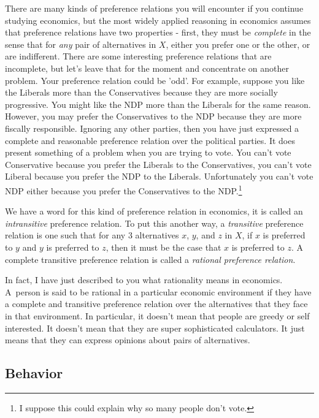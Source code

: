 \documentclass[12pt]{article}
\begin{document}
There are many kinds of preference relations you will encounter if you
continue studying economics, but the most widely applied reasoning in
economics assumes that preference relations have two properties - first, they
must be \emph{complete} in the sense that for \emph{any} pair of alternatives
in $X$, either you prefer one or the other, or are indifferent. There are some
interesting preference relations that are incomplete, but let's leave that for
the moment and concentrate on another problem. Your preference relation could
be 'odd'. For example, suppose you like the Liberals more than the
Conservatives because they are more socially progressive. You might like the
NDP more than the Liberals for the same reason. However, you may prefer the
Conservatives to the NDP because they are more fiscally responsible. Ignoring
any other parties, then you have just expressed a complete and reasonable
preference relation over the political parties. It does present something of a
problem when you are trying to vote. You can't vote Conservative because you
prefer the Liberals to the Conservatives, you can't vote Liberal because you
prefer the NDP to the Liberals. Unfortunately you can't vote NDP either
because you prefer the Conservatives to the NDP.\footnote{I suppose this could
explain why so many people don't vote.}

We have a word for this kind of preference relation in economics, it is called
an \emph{intransitive} preference relation. To put this another way, a
\emph{transitive }preference relation is one such that for any 3 alternatives
$x$, $y$, and $z$ in $X$, if $x$ is preferred to $y$ and $y$ is preferred to
$z$, then it must be the case that $x$ is preferred to $z$. A complete
transitive preference relation is called a \emph{rational preference relation}.

In fact, I have just described to you what rationality means in economics.
A\ person is said to be rational in a particular economic environment if they
have a complete and transitive preference relation over the alternatives that
they face in that environment. In particular, it doesn't mean that people are
greedy or self interested. It doesn't mean that they are super sophisticated
calculators. It just means that they can express opinions about pairs of alternatives.

\subsection{Behavior}
\end{document}
